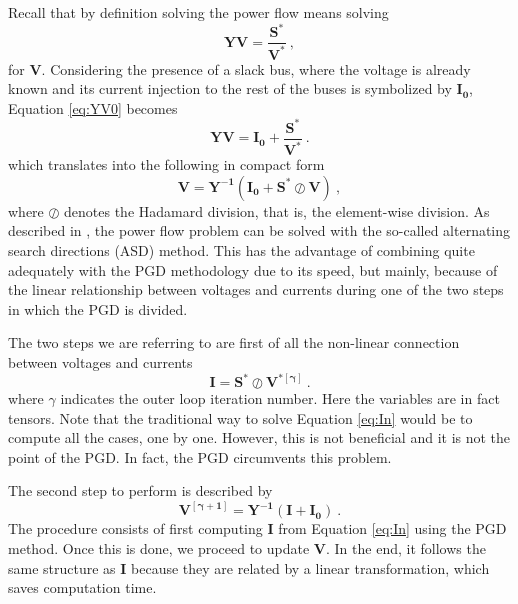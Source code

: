 Recall that by definition solving the power flow means solving
\begin{equation}
\bm{Y}\bm{V}=\frac{\bm{S^*}}{\bm{V^*}} \ ,
\label{eq:YV0}
\end{equation}
for $\bm{V}$. Considering the presence of a slack bus, where the voltage is already known and its current injection to the rest of the buses is symbolized by $\bm{I_0}$, Equation \ref{eq:YV0} becomes
\begin{equation}
\bm{YV} = \bm{I_0} + \bm{\frac{S^*}{V^*}} \ .
\label{eq:YV}
\end{equation}
which translates into the following in compact form
\begin{equation}
	\bm{V} = \bm{Y^{-1}}(\bm{I_0}+\bm{S^*}\oslash\bm{V}) \ ,
\label{eq:V1}
\end{equation}
where $\oslash$ denotes the Hadamard division, that is, the element-wise division. As described in \cite{garcia2016reduced}, the power flow problem can be solved with the so-called alternating search directions (ASD) method. This has the advantage of combining quite adequately with the PGD methodology due to its speed, but mainly, because of the linear relationship between voltages and currents during one of the two steps in which the PGD is divided. 

The two steps we are referring to are first of all the non-linear connection between voltages and currents
\begin{equation}
	\bm{I}=\bm{S^*}\oslash \bm{V^{*[\gamma]}} \ .
\label{eq:In}
\end{equation}
where $\gamma$ indicates the outer loop iteration number. Here the variables are in fact tensors. Note that the traditional way to solve Equation \ref{eq:In} would be to compute all the cases, one by one. However, this is not beneficial and it is not the point of the PGD. In fact, the PGD circumvents this problem. 

The second step to perform is described by 
\begin{equation}
	\bm{V^{[\gamma+1]}} = \bm{Y^{-1}}(\bm{I}+\bm{I_0}) \ .
\label{eq:Vg1}
\end{equation}
The procedure consists of first computing $\bm{I}$ from Equation \ref{eq:In} using the PGD method. Once this is done, we proceed to update $\bm{V}$. In the end, it follows the same structure as $\bm{I}$ because they are related by a linear transformation, which saves computation time.

